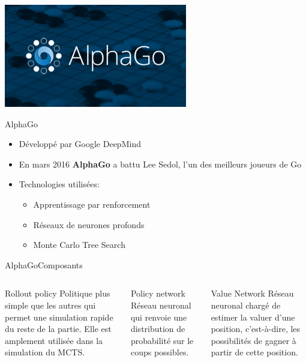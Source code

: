 \begin{frame}
	\begin{center}
		\includegraphics[width=8cm]{ressources/AlphaGoLogo}

	\end{center}
\end{frame}


\begin{frame}{AlphaGo}
	\begin{itemize}
		\item Développé par Google DeepMind
		\item En mars 2016 \textbf{AlphaGo} a battu Lee Sedol, l'un des meilleurs joueurs de Go
		\item Technologies utilisées:
		      \begin{itemize}
			      \item Apprentissage par renforcement
			      \item Réseaux de neurones profonds
			      \item Monte Carlo Tree Search
		      \end{itemize}
	\end{itemize}
\end{frame}



\begin{frame}{AlphaGo}{Composants}
	\begin{columns}[t]
		\begin{column}{.3\textwidth}
			\begin{block}{Rollout policy}
				Politique plus simple que les autres qui permet une simulation rapide du reste de la partie. Elle est amplement utilisée dans la simulation du MCTS.
			\end{block}
		\end{column}
		\begin{column}{.3\textwidth}
			\begin{block}{Policy network}
				Réseau neuronal qui renvoie une distribution de probabilité sur le coups possibles.
			\end{block}
		\end{column}
		\begin{column}{.3\textwidth}
			\begin{block}{Value Network}
				Réseau neuronal chargé de estimer la valuer d'une position, c'est-à-dire, les possibilités de gagner à partir de cette position.
			\end{block}
		\end{column}
	\end{columns}
\end{frame}

